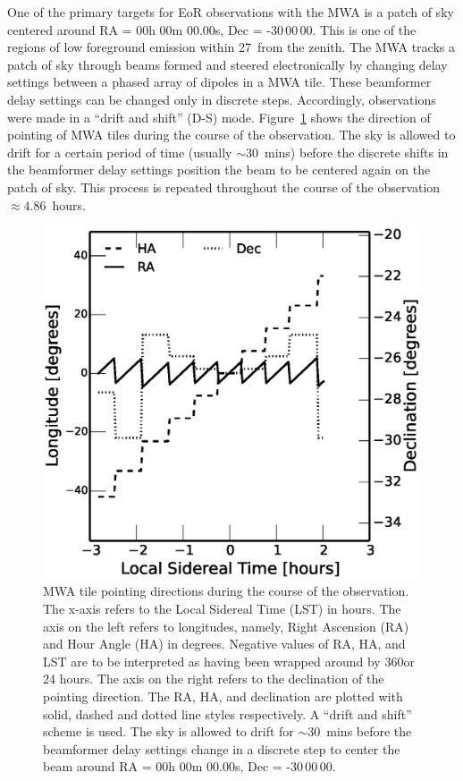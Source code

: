 \documentclass[preprint2,iop,numberedappendix]{emulateapj}
\begin{document}
One of the primary targets for EoR observations with the MWA is a patch of sky centered around RA = 00h 00m 00.00s, Dec = -30\arcdeg$\,$00\arcmin$\,$00. This is one of the regions of low foreground emission within 27\arcdeg$\,$ from the zenith. The MWA tracks a patch of sky through beams formed and steered electronically by changing delay settings between a phased array of dipoles in a MWA tile. These beamformer delay settings can be changed only in discrete steps. Accordingly, observations were made in a ``drift and shift'' (D-S) mode. Figure~\ref{fig:pointings} shows the direction of pointing of MWA tiles during the course of the observation. The sky is allowed to drift for a certain period of time (usually $\sim 30$~mins) before the discrete shifts in the beamformer delay settings position the beam to be centered again on the patch of sky. This process is repeated throughout the course of the observation $\approx 4.86$~hours. 

\begin{figure}[htb]
\centering
\includegraphics[width=\linewidth]{figures/v1_0/dns_pointings}
\caption{MWA tile pointing directions during the course of the observation. The x-axis refers to the Local Sidereal Time (LST) in hours. The axis on the left refers to longitudes, namely, Right Ascension (RA) and Hour Angle (HA) in degrees. Negative values of RA, HA, and LST are to be interpreted as having been wrapped around by 360\arcdeg or 24 hours. The axis on the right refers to the declination of the pointing direction. The RA, HA, and declination are plotted with solid, dashed and dotted line styles respectively. A ``drift and shift'' scheme is used. The sky is allowed to drift for $\sim 30$~mins before the beamformer delay settings change in a discrete step to center the beam around RA = 00h 00m 00.00s, Dec = -30\arcdeg$\,$00\arcmin$\,$00. \label{fig:pointings}}
\end{figure}
\end{document}
